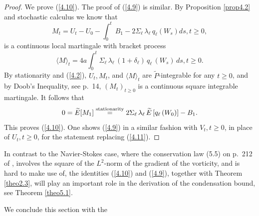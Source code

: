 \documentclass[12pt,leqno]{article}
\def\dis{\displaystyle}
\def\wt{\widetilde}
\begin{document}
\begin{proof}
We prove (\ref{4.10}). The proof of (\ref{4.9}) is similar. By Proposition \ref{prop4.2} and stochastic calculus we know that
\begin{equation}\label{4.11}
M_t = U_t - U_0 - \dis\int^t_0 \, B_1 - 2 \Sigma_\ell \, \lambda_\ell \, q_\ell (W_s) ds, t \ge 0,
\end{equation}
is a continuous local martingale with bracket process
\begin{equation}\label{4.12}
\langle M \rangle_t = 4 a \dis\int^t_0 \Sigma_\ell \,\lambda_\ell \, (1 + \delta_\ell)\, q_\ell \,(W_s) \, ds, t \ge 0.
\end{equation}
By stationarity and (\ref{4.2}), $U_t, M_t$, and $\langle M \rangle_t$ are $\wt{P}$-integrable for any $t \ge 0$, and by Doob's Inequality, see \cite{KaraShre88} p.~14, $(M_t)_{t \ge 0}$ is a continuous square integrable martingale. It follows that
\begin{equation}\label{4.13}
0 = \wt{E} [M_1] \stackrel{\rm stationarity}{=} 2 \Sigma_\ell \, \lambda_\ell \, \wt{E} \,[q_\ell \,(W_0)] - B_1.
\end{equation}
This proves (\ref{4.10}). One shows (\ref{4.9}) in a similar fashion with $V_t, t \ge 0$, in place of $U_t, t \ge 0$, for the statement replacing (\ref{4.11}).
\end{proof}

In contrast to the Navier-Stokes case, where the conservation law (5.5) on p.~212 of \cite{KuksShir12}, involves the square of the $L^2$-norm of the gradient of the vorticity, and is hard to make use of, the identities (\ref{4.10}) and (\ref{4.9}), together with Theorem \ref{theo2.3}, will play an important role in the derivation of the condensation bound, see Theorem \ref{theo5.1}.

\medskip
We conclude this section with the
\end{document}
